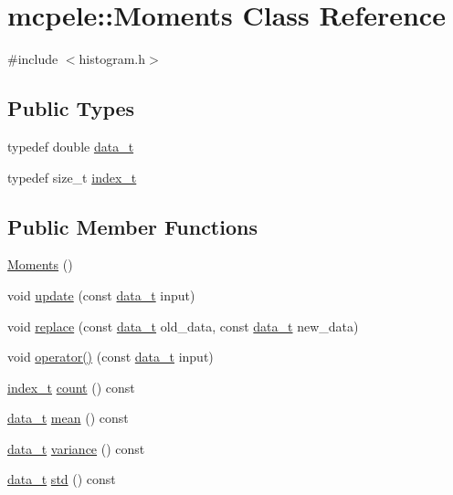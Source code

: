 \hypertarget{classmcpele_1_1Moments}{\section{mcpele\-:\-:\-Moments \-Class \-Reference}
\label{classmcpele_1_1Moments}
}


{\ttfamily \#include $<$histogram.\-h$>$}

\subsection*{\-Public \-Types}
\begin{DoxyCompactItemize}
\item 
typedef double \hyperlink{classmcpele_1_1Moments_a2dc6e59f3fa3498e008c64955a693e4b}{data\-\_\-t}
\item 
typedef size\-\_\-t \hyperlink{classmcpele_1_1Moments_a73dc5d511f63d1f4769d05bbc535f24c}{index\-\_\-t}
\end{DoxyCompactItemize}
\subsection*{\-Public \-Member \-Functions}
\begin{DoxyCompactItemize}
\item 
\hyperlink{classmcpele_1_1Moments_ad40f97eac46ca595e759f6d2e249b2ad}{\-Moments} ()
\item 
void \hyperlink{classmcpele_1_1Moments_a4013c89a1d84431b62ca3ad7d32d5278}{update} (const \hyperlink{classmcpele_1_1Moments_a2dc6e59f3fa3498e008c64955a693e4b}{data\-\_\-t} input)
\item 
void \hyperlink{classmcpele_1_1Moments_a6526753dd1c2be0863f7d02ddf8573b4}{replace} (const \hyperlink{classmcpele_1_1Moments_a2dc6e59f3fa3498e008c64955a693e4b}{data\-\_\-t} old\-\_\-data, const \hyperlink{classmcpele_1_1Moments_a2dc6e59f3fa3498e008c64955a693e4b}{data\-\_\-t} new\-\_\-data)
\item 
void \hyperlink{classmcpele_1_1Moments_aae097b850d24e7e969a0b69e0590cdfa}{operator()} (const \hyperlink{classmcpele_1_1Moments_a2dc6e59f3fa3498e008c64955a693e4b}{data\-\_\-t} input)
\item 
\hyperlink{classmcpele_1_1Moments_a73dc5d511f63d1f4769d05bbc535f24c}{index\-\_\-t} \hyperlink{classmcpele_1_1Moments_afb38f4e5675d4e3ecded24153d64f69b}{count} () const 
\item 
\hyperlink{classmcpele_1_1Moments_a2dc6e59f3fa3498e008c64955a693e4b}{data\-\_\-t} \hyperlink{classmcpele_1_1Moments_a1707a2b086488a643deb51e06bdf8c48}{mean} () const 
\item 
\hyperlink{classmcpele_1_1Moments_a2dc6e59f3fa3498e008c64955a693e4b}{data\-\_\-t} \hyperlink{classmcpele_1_1Moments_a1fffc728d29b659f9f8c6438168f794d}{variance} () const 
\item 
\hyperlink{classmcpele_1_1Moments_a2dc6e59f3fa3498e008c64955a693e4b}{data\-\_\-t} \hyperlink{classmcpele_1_1Moments_afe797a35a1e551a057348de77807d34e}{std} () const 
\end{DoxyCompactItemize}


